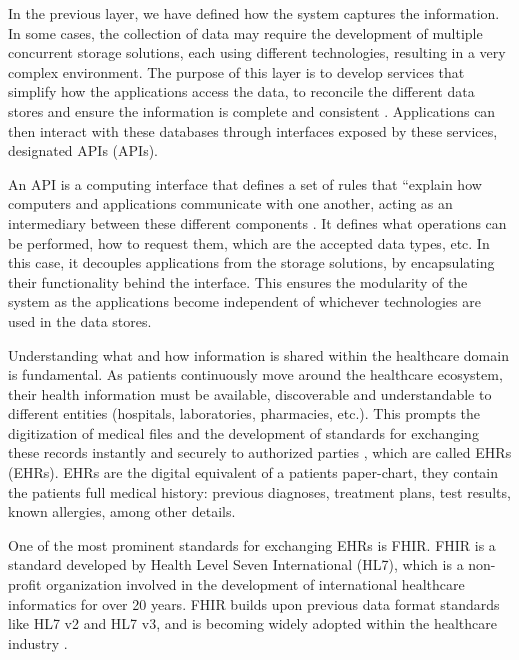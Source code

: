 
In the previous layer, we have defined how the system captures the information. In some cases, the collection of data may require the development of multiple concurrent storage solutions, each using different technologies, resulting in a very complex environment. The purpose of this layer is to develop services that simplify how the applications access the data, to reconcile the different data stores and ensure the information is complete and consistent \cite{Cisco2014}. Applications can then interact with these databases through interfaces exposed by these services, designated \acl{API}s (\acs{API}s). \bigskip 

An \acs{API} is a computing interface that defines a set of rules that ``explain how computers and applications communicate with one another, acting as an intermediary between these different components \cite{IBMAPI}. It defines what operations can be performed, how to request them, which are the accepted data types, etc. In this case, it decouples applications from the storage solutions, by encapsulating their functionality behind the interface. This ensures the modularity of the system as the applications become independent of whichever technologies are used in the data stores. \bigskip

Understanding what and how information is shared within the healthcare domain is fundamental. As patients continuously move around the healthcare ecosystem, their health information must be available, discoverable and understandable to different entities (hospitals, laboratories, pharmacies, etc.). This prompts the digitization of medical files and the development of standards for exchanging these records instantly and securely to authorized parties \cite{HL72019}, which are called \acl{EHR}s (\acs{EHR}s). \acs{EHR}s are the digital equivalent of a patients paper-chart, they contain the patients full medical history: previous diagnoses, treatment plans, test results, known allergies, among other details. \bigskip

One of the most prominent standards for exchanging \acs{EHR}s is \acf{FHIR}. \acs{FHIR} is a standard developed by Health Level Seven International (HL7), which is a non-profit organization involved in the development of international healthcare informatics for over 20 years. \acs{FHIR} builds upon previous data format standards like HL7 v2 and HL7 v3, and is becoming widely adopted within the healthcare industry \cite{Peng2019}. 

